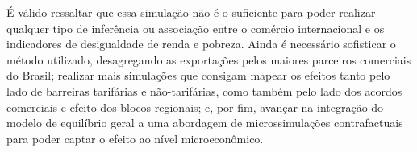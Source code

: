 É válido ressaltar que essa simulação não é o suficiente para poder realizar qualquer tipo de inferência ou associação entre o comércio internacional e os indicadores de desigualdade de renda e pobreza. Ainda é necessário sofisticar o método utilizado, desagregando as exportações pelos maiores parceiros comerciais do Brasil; realizar mais simulações que consigam mapear os efeitos tanto pelo lado de barreiras tarifárias e não-tarifárias, como também pelo lado dos acordos comerciais e efeito dos blocos regionais; e, por fim, avançar na integração do modelo de equilíbrio geral a uma abordagem de microssimulações contrafactuais para poder captar o efeito ao nível microeconômico.


